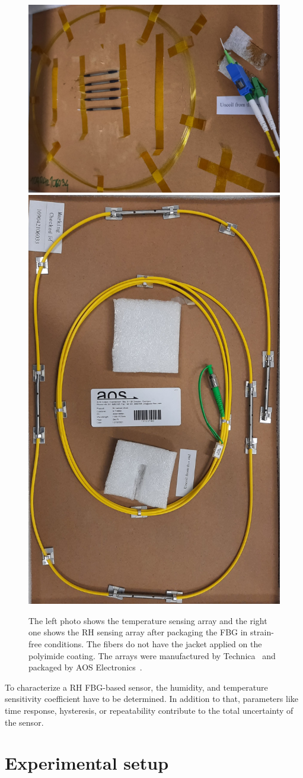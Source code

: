 \begin{figure}[!h]
\centering
\includegraphics[angle=90,width=0.43\columnwidth]{Chapter5/images/t_array1.jpg}
\includegraphics[angle=90,width=0.52\columnwidth]{Chapter5/images/rh_array1.jpg}
\caption{The left photo shows the temperature sensing array and the right one shows the \gls{RH} sensing array after packaging the FBG in strain-free conditions. The fibers do not have the jacket applied on the polyimide coating. The arrays were manufactured by Technica~\cite{technica} and packaged by AOS Electronics~\cite{AOS}.}
\label{fig_array_photo}
\end{figure}
To characterize a RH FBG-based sensor, the humidity, and temperature sensitivity coefficient have to be determined. In addition to that, parameters like time response, hysteresis, or repeatability contribute to the total uncertainty of the sensor. 
\newpage
\section{Experimental setup}
\label{fos:setup}

